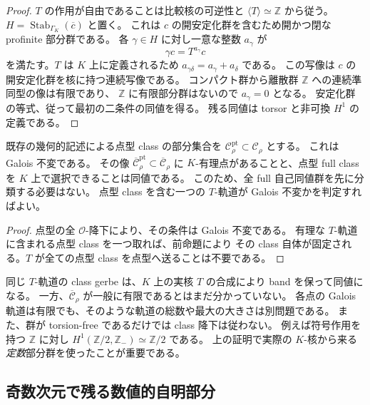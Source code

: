 \begin{proof}
$T$ の作用が自由であることは比較核の可逆性と
$\langle T\rangle\simeq\mathbb Z$ から従う。
$H=\operatorname{Stab}_{\Gamma_K}(\overline c)$ と置く。
これは $c$ の開安定化群を含むため開かつ閉な profinite 部分群である。
各 $\gamma\in H$ に対し一意な整数 $a_\gamma$ が
\[
 \gamma c=T^{a_\gamma}c
\]
を満たす。$T$ は $K$ 上に定義されるため
$a_{\gamma\delta}=a_\gamma+a_\delta$ である。
この写像は $c$ の開安定化群を核に持つ連続写像である。
コンパクト群から離散群 $\mathbb Z$ への連続準同型の像は有限であり、
$\mathbb Z$ に有限部分群はないので $a_\gamma=0$ となる。
安定化群の等式、従って最初の二条件の同値を得る。
残る同値は torsor と非可換 $H^1$ の定義である。
\end{proof}

\begin{corollary}
\label{cor:nfm-highdim-point-class-orbit}
既存の幾何的記述による点型 class の部分集合を
$\mathscr C_\rho^{\mathrm{pt}}\subset\mathscr C_\rho$ とする。
これは Galois 不変である。
その像
$\overline{\mathscr C}_\rho^{\mathrm{pt}}
\subset\overline{\mathscr C}_\rho$
に $K$-有理点があることと、点型 full class を $K$ 上で選択できることは同値である。
このため、全 full 自己同値群を先に分類する必要はない。
点型 class を含む一つの $T$-軌道が Galois 不変かを判定すればよい。
\end{corollary}

\begin{proof}
点型の全 $\mathcal O$-降下により、その条件は Galois 不変である。
有理な $T$-軌道に含まれる点型 class を一つ取れば、前命題により
その class 自体が固定される。$T$ が全ての点型 class を点型へ送ることは不要である。
\end{proof}

同じ $T$-軌道の class gerbe は、$K$ 上の実核 $T$ の合成により
band を保って同値になる。
一方、$\overline{\mathscr C}_\rho$ が一般に有限であるとはまだ分かっていない。
各点の Galois 軌道は有限でも、そのような軌道の総数や最大の大きさは別問題である。
また、群が torsion-free であるだけでは class 降下は従わない。
例えば符号作用を持つ $\mathbb Z$ に対し
$H^1(\mathbb Z/2,\mathbb Z_{-})\simeq\mathbb Z/2$ である。
上の証明で実際の $K$-核から来る\emph{定数}部分群を使ったことが重要である。

\subsection{奇数次元で残る数値的自明部分}

